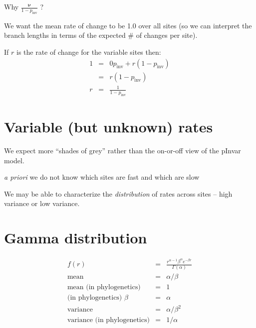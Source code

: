 \documentclass[landscape]{foils}
\begin{document}
\myNewSlide
\Large
Why $\frac{\bm \nu}{1-p_{\mbox{inv}}}$ ?

\large
We want the mean rate of change to be 1.0 over all sites (so we can interpret the branch lengths in terms of the expected \# of changes per site).

If $r$ is the rate of change for the variable sites then:
\begin{eqnarray*} 
	1 & = & 0 p_{\mbox{inv}} + r \left(1-p_{\mbox{inv}}\right)\\
	 & = & r \left(1-p_{\mbox{inv}}\right) \\
	 r & = & \frac{1}{1-p_{\mbox{inv}}}
\end{eqnarray*} 	

\myNewSlide
\section*{Variable (but unknown) rates}
\begin{compactitem}
	\item We expect more ``shades of grey'' rather than the on-or-off view of the pInvar model.
	\item {\em a priori} we do not know which sites are fast and which are slow
	\item We may be able to characterize the {\em distribution} of rates across sites -- high variance or low variance.
\end{compactitem}

\myNewSlide
 

\myNewSlide
\section*{Gamma distribution}
\begin{eqnarray*} 
	f(r) & = & \frac{r^{\alpha-1}\beta^{\alpha}e^{-\beta r}}{\Gamma(\alpha)} \\
	\mbox{mean} & = & \alpha/\beta \\
\mbox{mean (in phylogenetics)}	& = & 1 \\
	\mbox{(in phylogenetics) }\beta & = & \alpha \\
	\mbox{variance} & = & \alpha/{\beta^2} \\
\mbox{variance (in phylogenetics)}	& = & 1/{\alpha} \\
\end{eqnarray*} 


\myNewSlide
\end{document}
